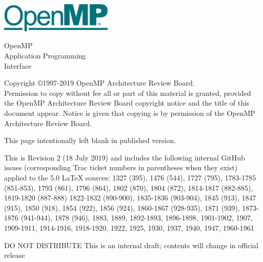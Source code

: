 
  \begin{titlepage}
    \begin{flushleft}
     \hspace{-6em} \includegraphics[width=0.4\textwidth]{openmp-logo.png}
    \end{flushleft}

    \begin{adjustwidth}{-0.75in}{0in}
    \begin{center}
      \Huge
      \textsf{OpenMP\\Application Programming\\Interface}

      \vspace{0.5in}\textsf{    }\vspace{-0.7in}
      \normalsize

      \vspace{1.0in}

      \textbf{\ompversion{}}
    \end{center}
    \end{adjustwidth}

    \vspace{3.0in}

\begin{adjustwidth}{0pt}{1em}\setlength{\parskip}{0.25\baselineskip}%
Copyright \copyright 1997-2019 OpenMP Architecture Review Board.\\
Permission to copy without fee all or part of this material is granted,
provided the OpenMP Architecture Review Board copyright notice and
the title of this document appear. Notice is given that copying is by
permission of the OpenMP Architecture Review Board.\end{adjustwidth}

  \end{titlepage}


\clearpage
\thispagestyle{empty}
\phantom{a}
This page intentionally left blank in published version.

This is Revision 2 (18 July 2019) and includes the following internal 
GitHub issues (corresponding Trac ticket numbers in parentheses when
they exist) applied to the 5.0 LaTeX sources: 1327 (395), 1476 (544), 
1727 (795), 1783-1785 (851-853), 1793 (861), 1796 (864), 1802 (870), 
1804 (872), 1814-1817 (882-885), 1819-1820 (887-888) 1822-1832 (890-900), 
1835-1836 (903-904), 1845 (913), 1847 (915), 1850 (918), 
1854 (922), 1856 (924), 1860-1867 (928-935), 1871 (939), 
1873-1876 (941-944), 1878 (946), 1883, 1889, 1892-1893, 1896-1898, 
1901-1902, 1907, 1909-1911, 1914-1916, 1918-1920, 1922, 1925, 1930, 
1937, 1940, 1947, 1960-1961

DO NOT DISTRIBUTE
This is an internal draft; contents will change in official release

\vfill

